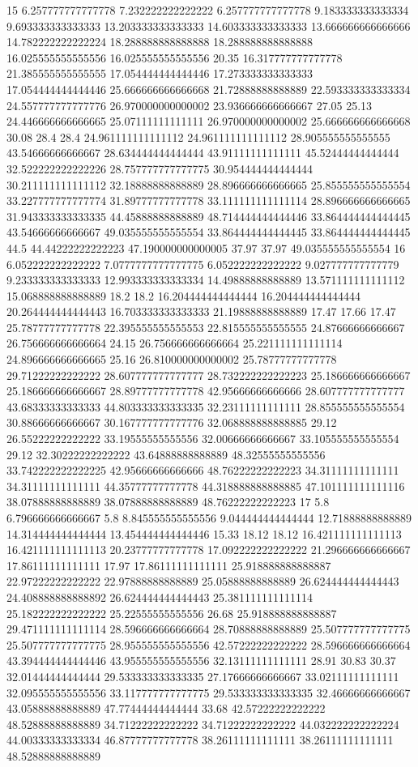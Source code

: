 15 6.257777777777778 7.232222222222222 6.257777777777778 9.183333333333334 9.693333333333333 13.203333333333333 14.603333333333333 13.666666666666666 14.782222222222224 18.288888888888888 18.288888888888888 16.025555555555556 16.025555555555556 20.35 16.317777777777778 21.385555555555555 17.054444444444446 17.273333333333333 17.054444444444446 25.666666666666668 21.72888888888889 22.593333333333334 24.557777777777776 26.970000000000002 23.936666666666667 27.05 25.13 24.446666666666665 25.07111111111111 26.970000000000002 25.666666666666668 30.08 28.4 28.4 24.961111111111112 24.961111111111112 28.905555555555555 43.54666666666667 28.634444444444444 43.91111111111111 45.52444444444444 32.522222222222226 28.757777777777775 30.954444444444444 30.211111111111112 32.18888888888889 28.896666666666665 25.855555555555554 33.227777777777774 31.89777777777778 33.111111111111114 28.896666666666665 31.943333333333335 44.45888888888889 48.714444444444446 33.864444444444445 43.54666666666667 49.035555555555554 33.864444444444445 33.864444444444445 44.5 44.44222222222223 47.190000000000005 37.97 37.97 49.035555555555554
16 6.052222222222222 7.0777777777777775 6.052222222222222 9.027777777777779 9.233333333333333 12.993333333333334 14.49888888888889 13.571111111111112 15.068888888888889 18.2 18.2 16.204444444444444 16.204444444444444 20.264444444444443 16.703333333333333 21.19888888888889 17.47 17.66 17.47 25.78777777777778 22.395555555555553 22.815555555555555 24.87666666666667 26.756666666666664 24.15 26.756666666666664 25.221111111111114 24.896666666666665 25.16 26.810000000000002 25.78777777777778 29.71222222222222 28.607777777777777 28.732222222222223 25.186666666666667 25.186666666666667 28.89777777777778 42.95666666666666 28.607777777777777 43.68333333333333 44.803333333333335 32.23111111111111 28.855555555555554 30.88666666666667 30.167777777777776 32.068888888888885 29.12 26.55222222222222 33.19555555555556 32.00666666666667 33.105555555555554 29.12 32.30222222222222 43.64888888888889 48.32555555555556 33.742222222222225 42.95666666666666 48.76222222222223 34.31111111111111 34.31111111111111 44.35777777777778 44.318888888888885 47.101111111111116 38.07888888888889 38.07888888888889 48.76222222222223
17 5.8 6.796666666666667 5.8 8.845555555555556 9.044444444444444 12.71888888888889 14.314444444444444 13.454444444444446 15.33 18.12 18.12 16.421111111111113 16.421111111111113 20.23777777777778 17.092222222222222 21.296666666666667 17.86111111111111 17.97 17.86111111111111 25.918888888888887 22.97222222222222 22.97888888888889 25.05888888888889 26.624444444444443 24.408888888888892 26.624444444444443 25.381111111111114 25.182222222222222 25.22555555555556 26.68 25.918888888888887 29.471111111111114 28.596666666666664 28.70888888888889 25.507777777777775 25.507777777777775 28.955555555555556 42.57222222222222 28.596666666666664 43.394444444444446 43.955555555555556 32.13111111111111 28.91 30.83 30.37 32.01444444444444 29.533333333333335 27.17666666666667 33.02111111111111 32.095555555555556 33.117777777777775 29.533333333333335 32.46666666666667 43.05888888888889 47.77444444444444 33.68 42.57222222222222 48.52888888888889 34.71222222222222 34.71222222222222 44.032222222222224 44.00333333333334 46.87777777777778 38.26111111111111 38.26111111111111 48.52888888888889
